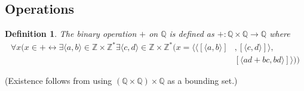 \documentclass{report}
\newtheorem{definition}[theo]{Definition}
\begin{document}
\subsection{Operations}
\begin{definition}
The binary operation $+$ on $\mathbb Q$ is defined as $+:\mathbb Q\times\mathbb Q\to\mathbb Q$ where
\begin{align*}
\forall x(x\in+\leftrightarrow\exists\langle a,b\rangle\in\mathbb Z\times\mathbb Z^*
\exists\langle c,d\rangle\in\mathbb Z\times\mathbb Z^*(x=\langle\langle[\langle a,b\rangle]&,[\langle c,d\rangle]\rangle,\\
&[\langle ad+bc,bd\rangle]\rangle))
\end{align*}
\end{definition}
\noindent(Existence follows from using $(\mathbb Q\times\mathbb Q)\times\mathbb Q$ as a bounding set.)
\end{document}
